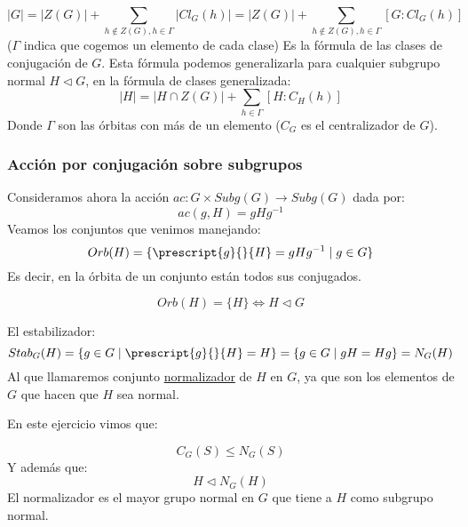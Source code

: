 
\begin{equation*}
    |G| = |Z(G)| + \sum_{h\notin Z(G), h\in \Gamma}|Cl_G(h)| = |Z(G)| + \sum_{h\notin Z(G), h\in \Gamma} [G:Cl_G(h)]
\end{equation*}
($\Gamma$ indica que cogemos un elemento de cada clase)
Es la fórmula de las clases de conjugación de $G$. Esta fórmula podemos generalizarla para cualquier subgrupo normal $H\lhd G$, en la fórmula de clases generalizada:
\begin{equation*}
    |H| = |H\cap Z(G)| + \sum_{h\in \Gamma} [H:C_H(h)]
\end{equation*}
Donde $\Gamma$ son las órbitas con más de un elemento ($C_G$ es el centralizador de $G$).

\subsubsection{Acción por conjugación sobre subgrupos}
Consideramos ahora la acción $ac:G\times Subg(G)\to Subg(G)$ dada por:
\begin{equation*}
    ac(g,H) = gHg^{-1}
\end{equation*}
Veamos los conjuntos que venimos manejando:
\begin{equation*}
    Orb(H) = \{\prescript{g}{}{H} = gHg^{-1}\mid g\in G\} 
\end{equation*}
Es decir, en la órbita de un conjunto están todos sus conjugados.

\begin{prop}
    \begin{equation*}
        Orb(H) = \{H\} \Longleftrightarrow H\lhd G
    \end{equation*}
\end{prop}
El estabilizador:
\begin{equation*}
    Stab_G(H) = \{g\in G \mid \prescript{g}{}{H} = H\} = \{g\in G \mid gH = Hg\} = N_G(H)
\end{equation*}
Al que llamaremos conjunto \underline{normalizador} de $H$ en $G$, ya que son los elementos de $G$ que hacen que $H$ sea normal.

En este ejercicio vimos que:
\begin{prop}
    \begin{equation*}
        C_G(S) \leq N_G(S)
    \end{equation*}    
    Y además que:
    \begin{equation*}
        H\lhd N_G(H)
    \end{equation*}
    El normalizador es el mayor grupo normal en $G$ que tiene a $H$ como subgrupo normal.
\end{prop}

